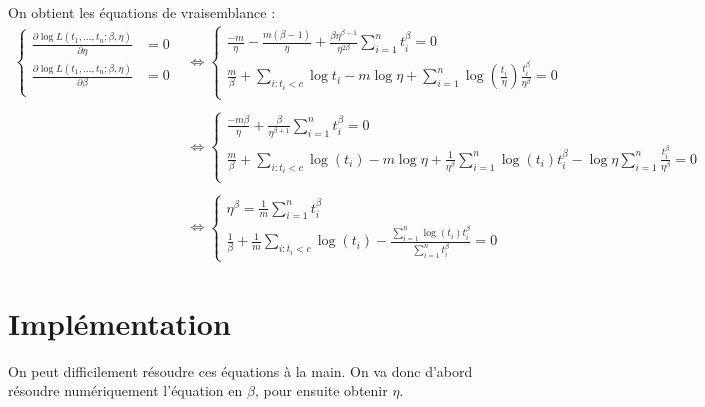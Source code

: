 \documentclass[a4paper]{report}
\begin{document}
     On obtient les équations de vraisemblance :
     \begin{align}
     	\begin{cases}
		\frac{\partial \log L(t_1,...,t_n;\beta,\eta)}{\partial \eta} & = 0 \nonumber\\
	 	\frac{\partial \log L(t_1,...,t_n;\beta,\eta)}{\partial \beta} & = 0 \nonumber\\
     	\end{cases}
     	&\iff 
      	\begin{cases}
		\frac{-m}{\eta} - \frac{m(\beta -1)}{\eta} + \frac{\beta \eta^{\beta-1}}		{\eta^{2\beta}} \sum_{i=1}^{n} {t_i^\beta} = 0  \nonumber\\
	 	\frac{m}{\beta} + \sum_{i:t_i<c}{\log t_i} - m \log \eta + \sum_{i=1}^{n} {\log (\frac{t_i}{\eta}) \frac{t_i^\beta}{\eta^\beta}} = 0  \nonumber\\
     	\end{cases}
   	\\
   	 \nonumber\\
   	&\iff
   	\begin{cases}
     		\frac{-m\beta}{\eta} + \frac{\beta}{\eta^{\beta+1}} \sum_{i=1}^{n} {t_i^\beta} = 0 \nonumber\\
		\frac{m}{\beta} +  \sum_{i:t_i<c}{\log (t_i)} - m\log \eta + \frac{1}{\eta^{\beta}} \sum_{i=1}^{n} {\log (t_i)} t_i^{\beta} - \log \eta \sum_{i=1}^{n} \frac{t_i^\beta}{\eta^\beta}  = 0 \nonumber\\
     	\end{cases}
     	\\
     	 \nonumber\\
     	&\iff
   	\begin{cases}
     		\eta^{\beta} = \frac{1}{m}  \sum_{i=1}^{n} {t_i^\beta} \label{eqEMV}\\
		\frac{1}{\beta} + \frac{1}{m} \sum_{i:t_i<c}{\log (t_i)} - \frac{\sum_{i=1}^{n}  {\log (t_i)} t_i^{\beta}}{\sum_{i=1}^{n} {t_i^{\beta}}}  = 0 
     	\end{cases}
\end{align}

\section{Implémentation \label{sec:impl}}

On peut difficilement résoudre ces équations à la main. On va donc d'abord résoudre numériquement l'équation en $\beta$, pour ensuite obtenir $\eta$.
\end{document}
